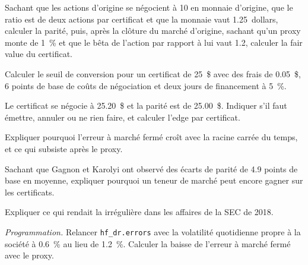 \begin{exercise}[$\star$]\label{exo:hf:depositary-receipts-and-dual-listings:1}
Sachant que les actions d'origine se négocient à 10 en monnaie d'origine, que le ratio est de deux actions par certificat et que la monnaie vaut 1.25~dollars, calculer la parité, puis, après la
clôture du marché d'origine, sachant qu'un proxy monte de 1~\% et que le bêta de l'action par rapport à lui vaut 1.2, calculer la fair value du certificat.
\end{exercise}

\begin{exercise}[$\star$]\label{exo:hf:depositary-receipts-and-dual-listings:2}
Calculer le seuil de conversion pour un certificat de 25~\$ avec des frais de 0.05~\$, 6 points de base de coûts de négociation et deux jours de financement à 5~\%.
\end{exercise}

\begin{exercise}[$\star$]\label{exo:hf:depositary-receipts-and-dual-listings:3}
Le certificat se négocie à 25.20~\$ et la parité est de 25.00~\$. Indiquer s'il faut émettre, annuler ou ne rien faire, et calculer l'edge par certificat.
\end{exercise}

\begin{exercise}[$\star\star$]\label{exo:hf:depositary-receipts-and-dual-listings:4}
Expliquer pourquoi l'erreur à marché fermé croît avec la racine carrée du temps, et ce qui subsiste après le proxy.
\end{exercise}

\begin{exercise}[$\star\star$]\label{exo:hf:depositary-receipts-and-dual-listings:5}
Sachant que Gagnon et Karolyi ont observé des écarts de parité de 4.9 points de base en moyenne, expliquer pourquoi un teneur de marché peut encore gagner sur les certificats.
\end{exercise}

\begin{exercise}[$\star\star$]\label{exo:hf:depositary-receipts-and-dual-listings:6}
Expliquer ce qui rendait la  irrégulière dans les affaires de la SEC de 2018.
\end{exercise}

\begin{exercise}[$\star\star\star$]\label{exo:hf:depositary-receipts-and-dual-listings:7}
\emph{Programmation.} Relancer \texttt{hf\_dr.errors} avec la volatilité quotidienne propre à la société à 0.6~\% au lieu de 1.2~\%. Calculer la baisse de
l'erreur à marché fermé avec le proxy.
\end{exercise}

